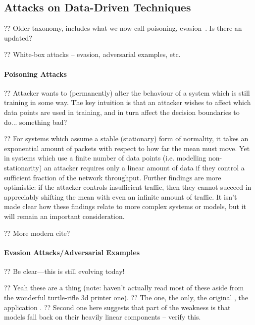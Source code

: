 \subsection{Attacks on Data-Driven Techniques}\label{sec:attacks-on-data-driven-techniques}

?? Older taxonomy, includes what we now call poisoning, evasion~\cite{DBLP:conf/ccs/BarrenoNSJT06}. Is there an updated?

?? White-box attacks -- evasion, adversarial examples, etc.

\paragraph{Poisoning Attacks}
?? Attacker wants to (permanently) alter the behaviour of a system which is still training in some way.
The key intuition is that an attacker wishes to affect which data points are used in training, and in turn affect the decision boundaries to do... something bad?

?? For systems which assume a stable (stationary) form of normality, it takes an exponential amount of packets with respect to how far the mean must move.
Yet in systems which use a finite number of data points (i.e. modelling non-stationarity) an attacker requires only a linear amount of data if they control a sufficient fraction of the network throughput.
Further findings are more optimistic: if the attacker controls insufficient traffic, then they cannot succeed in appreciably shifting the mean with even an infinite amount of traffic.
It isn't made clear how these findings relate to more complex systems or models, but it will remain an important consideration. \cite{DBLP:journals/jmlr/KloftL10}

?? More modern cite?

\paragraph{Evasion Attacks/Adversarial Examples}

?? Be clear---this is still evolving today!

?? Yeah these are a thing (note: haven't actually read most of these aside from the wonderful turtle-rifle 3d printer one).
?? The one, the only, the original \parencite{DBLP:journals/corr/SzegedyZSBEGF13}, the application \parencite{DBLP:journals/corr/GoodfellowSS14}.
?? Second one here suggests that part of the weakness is that models fall back on their heavily linear components -- verify this.

